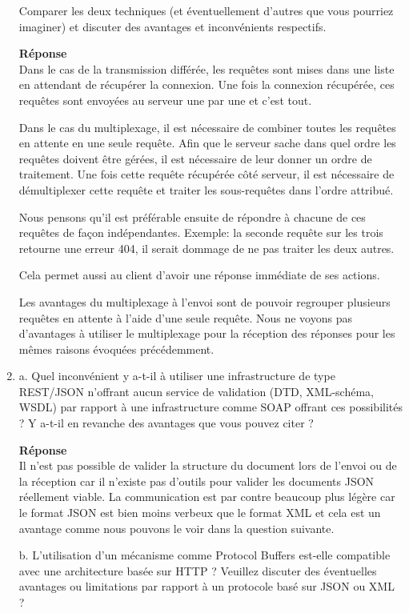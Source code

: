 \documentclass[a4paper]{article}
\begin{document}
\begin{enumerate}
    Comparer les deux techniques (et éventuellement d'autres que vous pourriez imaginer) et discuter des avantages et inconvénients respectifs.
    
    \textbf{Réponse} \\
    Dans le cas de la transmission différée, les requêtes sont mises dans une liste en attendant de récupérer la connexion. Une fois la connexion récupérée, ces requêtes sont envoyées au serveur une par une et c'est tout.
    
    Dans le cas du multiplexage, il est nécessaire de combiner toutes les requêtes en attente en une seule requête. Afin que le serveur sache dans quel ordre les requêtes doivent être gérées, il est nécessaire de leur donner un ordre de traitement. Une fois cette requête récupérée côté serveur, il est nécessaire de démultiplexer cette requête et traiter les sous-requêtes dans l'ordre attribué.
    
    Nous pensons qu'il est préférable ensuite de répondre à chacune de ces requêtes de façon indépendantes. Exemple: la seconde requête sur les trois retourne une erreur 404, il serait dommage de ne pas traiter les deux autres.
    
    Cela permet aussi au client d'avoir une réponse immédiate de ses actions.
    
    Les avantages du multiplexage à l'envoi sont de pouvoir regrouper plusieurs requêtes en attente à l'aide d'une seule requête. Nous ne voyons pas d'avantages à utiliser le multiplexage pour la réception des réponses pour les mêmes raisons évoquées précédemment.
    
    \item a. Quel inconvénient y a-t-il à utiliser une infrastructure de type REST/JSON n'offrant aucun
    service de validation (DTD, XML-schéma, WSDL) par rapport à une infrastructure comme SOAP
    offrant ces possibilités ? Y a-t-il en revanche des avantages que vous pouvez citer ?
    
    \textbf{Réponse} \\
    Il n'est pas possible de valider la structure du document lors de l'envoi ou de la réception car il n'existe pas d'outils pour valider les documents JSON réellement viable. La communication est par contre beaucoup plus légère car le format JSON est bien moins verbeux que le format XML et cela est un avantage comme nous pouvons le voir dans la question suivante.
    
    b. L’utilisation d’un mécanisme comme Protocol Buffers est-elle compatible avec une
    architecture basée sur HTTP ? Veuillez discuter des éventuelles avantages ou limitations par
    rapport à un protocole basé sur JSON ou XML ?
    

\end{enumerate}
\end{document}
